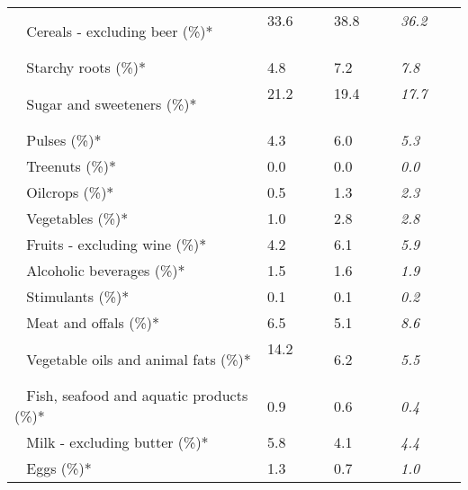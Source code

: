 \begin{tabular}{L{3.9cm} R{1cm} R{1cm} R{1cm}}
	 ~ Cereals - excluding beer (\%)* & 33.6 ~ \ \ & 38.8 ~ \ \ & \textit{36.2} ~ \ \ \\ 
	 ~ Starchy roots (\%)* & 4.8 ~ \ \ & 7.2 ~ \ \ & \textit{7.8} ~ \ \ \\ 
	 ~ Sugar and sweeteners (\%)* & 21.2 ~ \ \ & 19.4 ~ \ \ & \textit{17.7} ~ \ \ \\ 
	 ~ Pulses (\%)* & 4.3 ~ \ \ & 6.0 ~ \ \ & \textit{5.3} ~ \ \ \\ 
	 ~ Treenuts (\%)* & 0.0 ~ \ \ & 0.0 ~ \ \ & \textit{0.0} ~ \ \ \\ 
	 ~ Oilcrops (\%)* & 0.5 ~ \ \ & 1.3 ~ \ \ & \textit{2.3} ~ \ \ \\ 
	 ~ Vegetables (\%)* & 1.0 ~ \ \ & 2.8 ~ \ \ & \textit{2.8} ~ \ \ \\ 
	 ~ Fruits - excluding wine (\%)* & 4.2 ~ \ \ & 6.1 ~ \ \ & \textit{5.9} ~ \ \ \\ 
	 ~ Alcoholic beverages (\%)* & 1.5 ~ \ \ & 1.6 ~ \ \ & \textit{1.9} ~ \ \ \\ 
	 ~ Stimulants (\%)* & 0.1 ~ \ \ & 0.1 ~ \ \ & \textit{0.2} ~ \ \ \\ 
	 ~ Meat and offals (\%)* & 6.5 ~ \ \ & 5.1 ~ \ \ & \textit{8.6} ~ \ \ \\ 
	 ~ Vegetable oils and animal fats (\%)* & 14.2 ~ \ \ & 6.2 ~ \ \ & \textit{5.5} ~ \ \ \\ 
	 ~ Fish, seafood and aquatic products (\%)* & 0.9 ~ \ \ & 0.6 ~ \ \ & \textit{0.4} ~ \ \ \\ 
	 ~ Milk - excluding butter (\%)* & 5.8 ~ \ \ & 4.1 ~ \ \ & \textit{4.4} ~ \ \ \\ 
	 ~ Eggs (\%)* & 1.3 ~ \ \ & 0.7 ~ \ \ & \textit{1.0} ~ \ \ \\ 
       \toprule
      \end{tabular}
      \clearpage
{}
